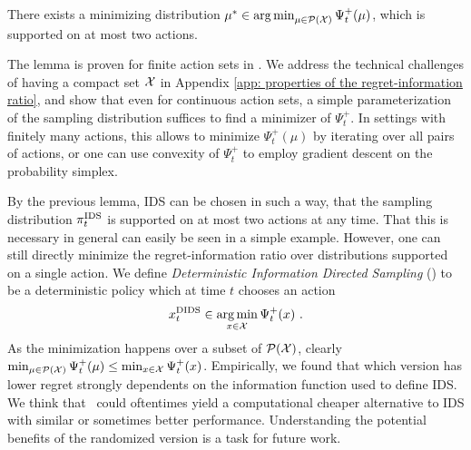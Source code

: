 \begin{lemma}\label{lemma: minimizer supported on at most two atoms}
 There exists a minimizing distribution $\mu^* \in \operatorname*{arg\,min}_{\mu \in \mathcal{P}(\mathcal{X})} \Psi_t^+(\mu)$, which is supported on at most two actions.
\end{lemma} 
The lemma is proven for finite action sets in \citep{RussoLearningOptimizeInformationDirected2014}. We address the technical challenges of having a compact set $\mathcal{X}$ in Appendix \ref{app: properties of the regret-information ratio}, and show that even for continuous action sets, a simple parameterization of the sampling distribution suffices to find a minimizer of $\Psi_t^+$. In settings with finitely many actions, this allows to minimize $\Psi_t^+(\mu)$ by iterating over all pairs of actions, or one can use convexity of $\Psi_t^+$ to employ gradient descent on the probability simplex. 

By the previous lemma, IDS can be chosen in such a way, that the sampling distribution $\pi_t^{\text{IDS}}$ is supported on at most two actions at any time. That this is necessary in general can easily be seen in a simple example. However, one can still directly minimize the regret-information ratio over distributions supported on a single action. We define \emph{Deterministic Information Directed Sampling} (\DIDS) to be a deterministic policy which at time $t$ chooses an action 
\begin{align}
x_t^{\text{DIDS}} \in \operatorname*{arg\,min}_{x \in \mathcal{X}} \Psi_t^+(x) \text{ .} 
\end{align}
As the minimization happens over a subset of $\mathcal{P}(\mathcal{X})$, clearly $\min_{\mu \in \mathcal{P}(\mathcal{X})} \Psi_t^+(\mu) \leq \min_{x \in \mathcal{X}}\Psi_t^+(x)$. Empirically, we found that which version has lower regret strongly dependents on the information function used to define IDS. We think that \DIDS\ could oftentimes yield a computational cheaper alternative to IDS with similar or sometimes better performance. Understanding the potential benefits of the randomized version is a task for future work.

\newpage

